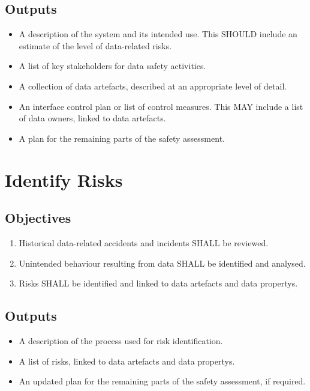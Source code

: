 \subsection{Outputs}
\begin{itemize}
	\item A description of the system and its intended use. This SHOULD include an estimate of the level of data-related risks.
	\item A list of key \glspl{stakeholder} for data safety activities.
	\item A collection of \glspl{data artefact}, described at an appropriate level of detail.
	\item An interface control plan or list of control measures. This MAY include a list of \glspl{data owner}, linked to \glspl{data artefact}.
	\item A plan for the remaining parts of the \gls{safety assessment}.
\end{itemize}

\section{Identify Risks}
\subsection{Objectives}
\begin{enumerate}[label=\color{dsiwgAccentColour}{2-\arabic*}]
	\item Historical data-related accidents and incidents SHALL be reviewed.
	\item Unintended behaviour resulting from data SHALL be identified and analysed.
	\item Risks SHALL be identified and linked to \glspl{data artefact} and \glspl{data property}.
\end{enumerate}

\subsection{Outputs}
\begin{itemize}
	\item A description of the process used for risk identification.
	\item A list of risks, linked to \glspl{data artefact} and \glspl{data property}.
	\item An updated plan for the remaining parts of the \gls{safety assessment}, if required.
\end{itemize}

